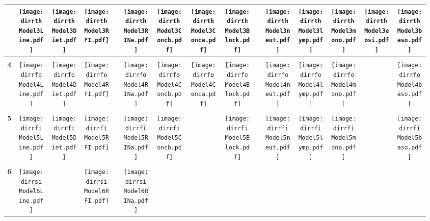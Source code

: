 \documentclass[landscape]{article}
\def \dirrth {U:/R/RA/Data/RFI-newdata/resultpairedcbc/pvalue05/Model3.Line.Diet.RFI.Concb.Conca.RINa.neut.lymp.mono.eosi.baso.Block/}
\def \dirrfo {U:/R/RA/Data/RFI-newdata/resultpairedcbc/pvalue05/Model4.Line.Diet.RFI.Concb.Conca.RINa.neut.lymp.mono.baso.Block/}
\def \dirrfi {U:/R/RA/Data/RFI-newdata/resultpairedcbc/pvalue05/Model5.Line.Diet.RFI.Concb.RINa.neut.lymp.mono.baso.Block/}
\def \dirrsi{U:/R/RA/Data/RFI-newdata/resultpairedcbc/pvalue05/Model6.Line.RFI.Concb.RINa.neut.lymp.mono.baso.Block/}
\begin{document}
\begin{table}
\begin{tabular}{ccccccccccccccc}
      &\texttt{[image: \\dirrth Model3Line.pdf]}
      &\texttt{[image: \\dirrth Model3Diet.pdf]}
      &\texttt{[image: \\dirrth Model3RFI.pdf]}
      &
      &\texttt{[image: \\dirrth Model3RINa.pdf]}
      &\texttt{[image: \\dirrth Model3Concb.pdf]}
      &\texttt{[image: \\dirrth Model3Conca.pdf]}
      &\texttt{[image: \\dirrth Model3Block.pdf]}
      &
      &\texttt{[image: \\dirrth Model3neut.pdf]}
      &\texttt{[image: \\dirrth Model3lymp.pdf]}
      &\texttt{[image: \\dirrth Model3mono.pdf]}
      &\texttt{[image: \\dirrth Model3eosi.pdf]}
      &\texttt{[image: \\dirrth Model3baso.pdf]}
     \\
     \hline
     \\
     {\Huge \textbf{4}} 
      &\texttt{[image: \\dirrfo Model4Line.pdf]}
      &\texttt{[image: \\dirrfo Model4Diet.pdf]}
      &\texttt{[image: \\dirrfo Model4RFI.pdf]}
      &
      &\texttt{[image: \\dirrfo Model4RINa.pdf]}
      &\texttt{[image: \\dirrfo Model4Concb.pdf]}
      &\texttt{[image: \\dirrfo Model4Conca.pdf]}
      &\texttt{[image: \\dirrfo Model4Block.pdf]}
      &
      &\texttt{[image: \\dirrfo Model4neut.pdf]}
      &\texttt{[image: \\dirrfo Model4lymp.pdf]}
      &\texttt{[image: \\dirrfo Model4mono.pdf]}
      &
      &\texttt{[image: \\dirrfo Model4baso.pdf]}
     \\
     \hline
     \\
     {\Huge \textbf{5}} 
      &\texttt{[image: \\dirrfi Model5Line.pdf]}
      &\texttt{[image: \\dirrfi Model5Diet.pdf]}
      &\texttt{[image: \\dirrfi Model5RFI.pdf]}
      &
      &\texttt{[image: \\dirrfi Model5RINa.pdf]}
      &\texttt{[image: \\dirrfi Model5Concb.pdf]}
      &
      &\texttt{[image: \\dirrfi Model5Block.pdf]}
      &
      &\texttt{[image: \\dirrfi Model5neut.pdf]}
      &\texttt{[image: \\dirrfi Model5lymp.pdf]}
      &\texttt{[image: \\dirrfi Model5mono.pdf]}
      &
      &\texttt{[image: \\dirrfi Model5baso.pdf]}
     \\
     \hline
     \\
     {\Huge \textbf{6}} 
      &\texttt{[image: \\dirrsi Model6Line.pdf]}
      &
      &\texttt{[image: \\dirrsi Model6RFI.pdf]}
      &
      &\texttt{[image: \\dirrsi Model6RINa.pdf]}

\end{tabular}
\end{table}
\end{document}
